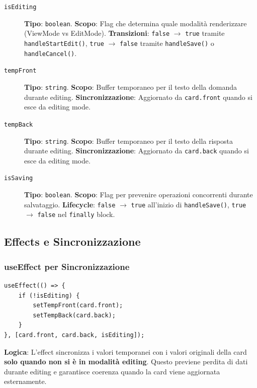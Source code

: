 \documentclass[11pt,a4paper]{article}
\begin{document}
\begin{description}
    \item[\texttt{isEditing}] \textbf{Tipo}: \texttt{boolean}. \textbf{Scopo}: Flag che determina quale modalità renderizzare (ViewMode vs EditMode). \textbf{Transizioni}: \texttt{false} $\rightarrow$ \texttt{true} tramite \texttt{handleStartEdit()}, \texttt{true} $\rightarrow$ \texttt{false} tramite \texttt{handleSave()} o \texttt{handleCancel()}.
    
    \item[\texttt{tempFront}] \textbf{Tipo}: \texttt{string}. \textbf{Scopo}: Buffer temporaneo per il testo della domanda durante editing. \textbf{Sincronizzazione}: Aggiornato da \texttt{card.front} quando si esce da editing mode.
    
    \item[\texttt{tempBack}] \textbf{Tipo}: \texttt{string}. \textbf{Scopo}: Buffer temporaneo per il testo della risposta durante editing. \textbf{Sincronizzazione}: Aggiornato da \texttt{card.back} quando si esce da editing mode.
    
    \item[\texttt{isSaving}] \textbf{Tipo}: \texttt{boolean}. \textbf{Scopo}: Flag per prevenire operazioni concorrenti durante salvataggio. \textbf{Lifecycle}: \texttt{false} $\rightarrow$ \texttt{true} all'inizio di \texttt{handleSave()}, \texttt{true} $\rightarrow$ \texttt{false} nel \texttt{finally} block.
\end{description}

\subsection{Effects e Sincronizzazione}

\subsubsection{useEffect per Sincronizzazione}

\begin{lstlisting}[style=typescript, caption=Sincronizzazione State]
useEffect(() => {
    if (!isEditing) {
        setTempFront(card.front);
        setTempBack(card.back);
    }
}, [card.front, card.back, isEditing]);
\end{lstlisting}

\textbf{Logica}: L'effect sincronizza i valori temporanei con i valori originali della card \textbf{solo quando non si è in modalità editing}. Questo previene perdita di dati durante editing e garantisce coerenza quando la card viene aggiornata esternamente.
\end{document}

